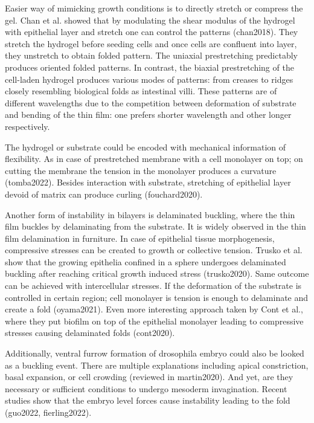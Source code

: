 \documentclass[
]{article}
\begin{document}
Easier way of mimicking growth conditions is to directly stretch or
compress the gel. Chan et al. showed that by modulating the shear
modulus of the hydrogel with epithelial layer and stretch one can
control the patterns (chan2018). They stretch the hydrogel before
seeding cells and once cells are confluent into layer, they unstretch to
obtain folded pattern. The uniaxial prestretching predictably produces
oriented folded patterns. In contrast, the biaxial prestretching of the
cell-laden hydrogel produces various modes of patterns: from creases to
ridges closely resembling biological folds as intestinal villi. These
patterns are of different wavelengths due to the competition between
deformation of substrate and bending of the thin film: one prefers
shorter wavelength and other longer respectively.

The hydrogel or substrate could be encoded with mechanical information
of flexibility. As in case of prestretched membrane with a cell
monolayer on top; on cutting the membrane the tension in the monolayer
produces a curvature (tomba2022). Besides interaction with substrate,
stretching of epithelial layer devoid of matrix can produce curling
(fouchard2020).

Another form of instability in bilayers is delaminated buckling, where
the thin film buckles by delaminating from the substrate. It is widely
observed in the thin film delamination in furniture. In case of
epithelial tissue morphogenesis, compressive stresses can be created to
growth or collective tension. Trusko et al. show that the growing
epithelia confined in a sphere undergoes delaminated buckling after
reaching critical growth induced stress (trusko2020). Same outcome can
be achieved with intercellular stresses. If the deformation of the
substrate is controlled in certain region; cell monolayer is tension is
enough to delaminate and create a fold (oyama2021). Even more
interesting approach taken by Cont et al., where they put biofilm on top
of the epithelial monolayer leading to compressive stresses causing
delaminated folds (cont2020).

Additionally, ventral furrow formation of drosophila embryo could also
be looked as a buckling event. There are multiple explanations including
apical constriction, basal expansion, or cell crowding (reviewed in
martin2020). And yet, are they necessary or sufficient conditions to
undergo mesoderm invagination. Recent studies show that the embryo level
forces cause instability leading to the fold (guo2022, fierling2022).
\end{document}
